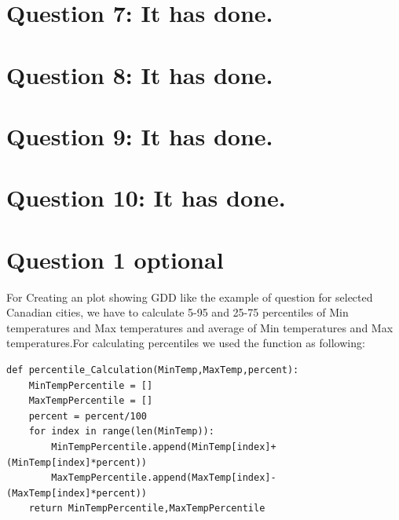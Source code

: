 \documentclass[12pt,letterpaper]{article}
\begin{document}
\section{Question 7: It has done.}
\section{Question 8: It has done.}
\section{Question 9: It has done.}
\section{Question 10: It has done.}
\section{Question 1 optional}
For Creating an plot showing GDD like the example of question for selected Canadian cities, we have to calculate 5-95 and 25-75 percentiles of Min temperatures and Max temperatures and average of Min temperatures and Max temperatures.For calculating percentiles we used the function as following:\\
\begin{verbatim}
def percentile_Calculation(MinTemp,MaxTemp,percent):
	MinTempPercentile = []
	MaxTempPercentile = []
	percent = percent/100
	for index in range(len(MinTemp)):
		MinTempPercentile.append(MinTemp[index]+(MinTemp[index]*percent))
		MaxTempPercentile.append(MaxTemp[index]-(MaxTemp[index]*percent))
	return MinTempPercentile,MaxTempPercentile
\end{verbatim}
\end{document}
